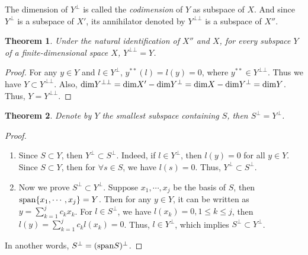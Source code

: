 \documentclass[11pt]{book}
\newtheorem{theorem}{Theorem}[chapter]
\theoremstyle{definition}
\numberwithin{equation}{chapter}
\begin{document}
\medskip

The dimension of $Y^\bot$ is called the \emph{codimension} of $Y$ as subspace of $X$. And since $Y^\bot$ is a subspace of $X'$, its annihilator denoted by $Y^{\bot \bot}$ is a subspace of $X''$.

\medskip

\begin{theorem}
Under the natural identification of $X''$ and $X$, for every subspace $Y$ of a finite-dimensional space $X$, $Y^{\bot\bot} = Y$.
\end{theorem}
\begin{proof}
For any $y\in Y$ and $l\in Y^\bot$, $y^{**}(l) = l(y) = 0$, where $y^{**} \in Y^{\bot\bot}$. Thus we have $Y\subset Y^{\bot\bot}$. Also, ${\rm dim}Y^{\bot\bot} = {\rm dim}X' - {\rm dim}Y^\bot = {\rm dim}X - {\rm dim}Y^\bot = {\rm dim}Y$. Thus, $Y = Y^{\bot\bot}$.
\end{proof}

\medskip

\begin{theorem}
Denote by $Y$ the smallest subspace containing $S$, then $S^\bot = Y^\bot$.
\end{theorem}
\begin{proof}
~\begin{enumerate}[label=(\alph*)]
    \item Since $S\subset Y$, then $Y^\bot\subset S^\bot$. Indeed, if $l\in Y^\bot$, then $l(y) = 0$ for all $y\in Y$. Since $S\subset Y$, then for $\forall s\in S$, we have $l(s) = 0$. Thus, $Y^\bot\subset S^\bot$. 
    \item Now we prove $S^\bot\subset Y^\bot$. Suppose $x_1,\cdots,x_j$ be the basis of $S$, then ${\rm span}\{x_1,\cdots,x_j\} = Y$. Then for any $y\in Y$, it can be written as $y = \sum^j_{k=1}c_k x_k$. For $l\in S^\bot$, we have $l(x_k) = 0, 1\leq k \leq j$, then $l(y) = \sum^j_{k=1}c_k l(x_k) = 0$. Thus, $l\in Y^\bot$, which implies $S^\bot\subset Y^\bot$. 
\end{enumerate}
In another words, $S^\bot = ({\rm span} S)^\bot$.
\end{proof}

\medskip
\end{document}

